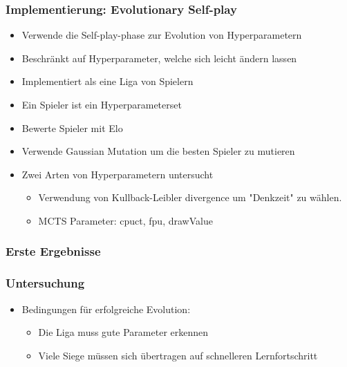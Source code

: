 \begin{frame}
 \frametitle{Implementierung: Evolutionary Self-play}
  


\begin{itemize}
  \item \pause Verwende die Self-play-phase zur Evolution von Hyperparametern
  \item \pause Beschränkt auf Hyperparameter, welche sich leicht ändern lassen
  \item \pause Implementiert als eine Liga von Spielern
  \item \pause Ein Spieler ist ein Hyperparameterset
  \item \pause Bewerte Spieler mit Elo
  \item \pause Verwende Gaussian Mutation um die besten Spieler zu mutieren
\end{itemize}

\begin{itemize}
  \item \pause Zwei Arten von Hyperparametern untersucht
\begin{itemize}
  \item \pause Verwendung von Kullback-Leibler divergence um "Denkzeit" zu wählen.
  \item \pause MCTS Parameter: cpuct, fpu, drawValue
\end{itemize}
\end{itemize}

  
\end{frame}
\begin{frame}
 \frametitle{Erste Ergebnisse}
  



  
\end{frame}
\begin{frame}
 \frametitle{Untersuchung}
  


\begin{itemize}
  \item \pause Bedingungen für erfolgreiche Evolution:
\begin{itemize}
  \item \pause Die Liga muss gute Parameter erkennen
  \item \pause Viele Siege müssen sich übertragen auf schnelleren Lernfortschritt
\end{itemize}
\end{itemize}

  
\end{frame}
